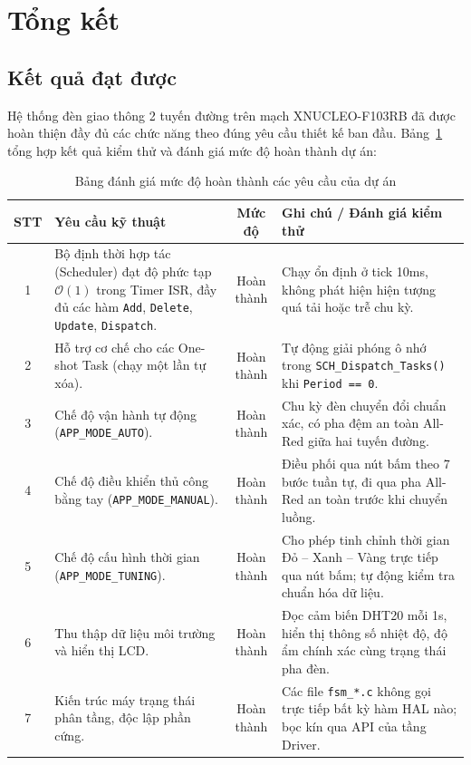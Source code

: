 \section{Tổng kết}

\subsection{Kết quả đạt được}
Hệ thống đèn giao thông 2 tuyến đường trên mạch XNUCLEO-F103RB đã được hoàn thiện đầy đủ các chức năng theo đúng yêu cầu thiết kế ban đầu. Bảng~\ref{tab:evaluation_results} tổng hợp kết quả kiểm thử và đánh giá mức độ hoàn thành dự án:

\begin{table}[H]
\centering
\small
\begin{tabularx}{\textwidth}{|c|X|c|p{4.5cm}|}
\hline
\textbf{STT} & \textbf{Yêu cầu kỹ thuật} & \textbf{Mức độ} & \textbf{Ghi chú / Đánh giá kiểm thử} \\ \hline
1 & Bộ định thời hợp tác (Scheduler) đạt độ phức tạp $\mathcal{O}(1)$ trong Timer ISR, đầy đủ các hàm \texttt{Add}, \texttt{Delete}, \texttt{Update}, \texttt{Dispatch}. & Hoàn thành & Chạy ổn định ở tick 10ms, không phát hiện hiện tượng quá tải hoặc trễ chu kỳ. \\ \hline
2 & Hỗ trợ cơ chế cho các One-shot Task (chạy một lần tự xóa). & Hoàn thành & Tự động giải phóng ô nhớ trong \texttt{SCH\_Dispatch\_Tasks()} khi \texttt{Period == 0}. \\ \hline
3 & Chế độ vận hành tự động (\texttt{APP\_MODE\_AUTO}). & Hoàn thành & Chu kỳ đèn chuyển đổi chuẩn xác, có pha đệm an toàn All-Red giữa hai tuyến đường. \\ \hline
4 & Chế độ điều khiển thủ công bằng tay (\texttt{APP\_MODE\_MANUAL}). & Hoàn thành & Điều phối qua nút bấm theo 7 bước tuần tự, đi qua pha All-Red an toàn trước khi chuyển luồng. \\ \hline
5 & Chế độ cấu hình thời gian (\texttt{APP\_MODE\_TUNING}). & Hoàn thành & Cho phép tinh chỉnh thời gian Đỏ -- Xanh -- Vàng trực tiếp qua nút bấm; tự động kiểm tra chuẩn hóa dữ liệu. \\ \hline
6 & Thu thập dữ liệu môi trường và hiển thị LCD. & Hoàn thành & Đọc cảm biến DHT20 mỗi 1s, hiển thị thông số nhiệt độ, độ ẩm chính xác cùng trạng thái pha đèn. \\ \hline
7 & Kiến trúc máy trạng thái phân tầng, độc lập phần cứng. & Hoàn thành & Các file \texttt{fsm\_*.c} không gọi trực tiếp bất kỳ hàm HAL nào; bọc kín qua API của tầng Driver. \\ \hline
\end{tabularx}
\caption{Bảng đánh giá mức độ hoàn thành các yêu cầu của dự án}
\label{tab:evaluation_results}
\end{table}

